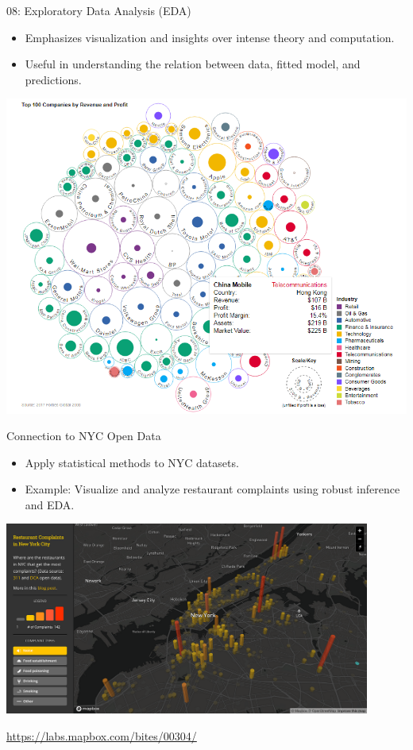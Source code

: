 \documentclass{beamer}
\begin{document}
\begin{frame}{08: Exploratory Data Analysis (EDA)}
\begin{itemize}
    \item Emphasizes visualization and insights over intense theory and computation.
    \item Useful in understanding the relation between data, fitted model, and predictions.
\end{itemize}

\includegraphics[width=\textwidth]{bubble-chart.png} %
\end{frame}

\begin{frame}{Connection to NYC Open Data}
\begin{itemize}
    \item Apply statistical methods to NYC datasets.
    \item Example: Visualize and analyze restaurant complaints using robust inference and EDA.
\end{itemize}

\begin{center}
  \includegraphics[width=0.9\textwidth]{nyc-open-data.png}
\end{center}

\begin{center}
    \small \url{https://labs.mapbox.com/bites/00304/} %
\end{center}
\end{frame}
\end{document}
